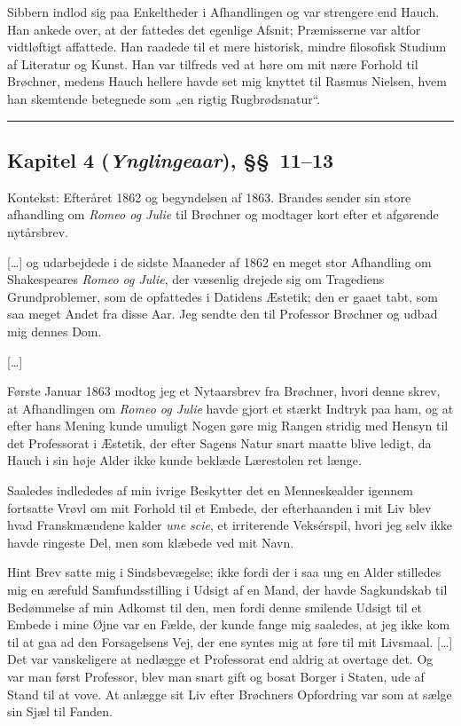 \documentclass[12pt,a4paper]{article}
\newcommand{\apage}[1]{\marginnote{\footnotesize\textit{[#1]}}}
\begin{document}
\medskip

\apage{137}Sibbern indlod sig paa Enkeltheder i Afhandlingen og var
strengere end Hauch. Han ankede over, at der fattedes det egenlige Afsnit;
Præmisserne var altfor vidtløftigt affattede. Han raadede til et mere
historisk, mindre filosofisk Studium af Literatur og Kunst. Han var
tilfreds ved at høre om mit nære Forhold til Brøchner, medens Hauch
hellere havde set mig knyttet til Rasmus Nielsen, hvem han skemtende
betegnede som „en rigtig Rugbrødsnatur“.

\bigskip\hrule\bigskip

\subsection*{Kapitel 4 (\emph{Ynglingeaar}), §§~11--13}

\noindent Kontekst: Efteråret 1862 og begyndelsen af 1863. Brandes sender
sin store afhandling om \textit{Romeo og Julie} til Brøchner og modtager
kort efter et afgørende nytårsbrev.

\medskip

[\ldots] og udarbejdede i de sidste Maaneder af 1862 en
meget stor Afhandling om Shakespeares \textit{Romeo og Julie}, der
væsenlig \apage{153}drejede sig om Tragediens Grundproblemer, som de opfattedes i
Datidens Æstetik; den er gaaet tabt, som saa meget Andet fra disse Aar.
Jeg sendte den til Professor Brøchner og udbad mig dennes Dom.

\apage{154}{}[\ldots]

Første Januar 1863 modtog jeg et Nytaarsbrev fra Brøchner,
hvori denne skrev, at Afhandlingen om \textit{Romeo og Julie} havde gjort
et stærkt Indtryk paa ham, og at efter hans Mening kunde umuligt Nogen
gøre mig Rangen stridig med Hensyn til det Professorat i Æstetik, der
efter Sagens Natur snart maatte blive ledigt, da Hauch i sin høje Alder
ikke kunde beklæde Lærestolen ret længe.

Saaledes indlededes af min ivrige Beskytter det en Menneskealder igennem
fortsatte Vrøvl om mit Forhold til et Embede, der efterhaanden i mit Liv
blev hvad Franskmændene kalder \textit{une scie}, et irriterende
Veksérspil, hvori jeg selv ikke havde ringeste Del, men som klæbede ved
mit Navn.

Hint Brev satte mig i Sindsbevægelse; ikke fordi der i saa
ung en Alder stilledes mig en ærefuld Samfundsstilling i Udsigt af en
Mand, der havde Sagkundskab til \apage{155}Bedømmelse af min Adkomst til den, men
fordi denne smilende Udsigt til et Embede i mine Øjne var en Fælde, der
kunde fange mig saaledes, at jeg ikke kom til at gaa ad den Forsagelsens
Vej, der ene syntes mig at føre til mit Livsmaal. [\ldots] Det var
vanskeligere at nedlægge et Professorat end aldrig at overtage det. Og
var man først Professor, blev man snart gift og bosat Borger i Staten,
ude af Stand til at vove. At anlægge sit Liv efter Brøchners Opfordring
var som at sælge sin Sjæl til Fanden.
\end{document}
